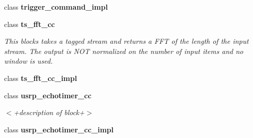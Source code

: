 \begin{DoxyCompactItemize}
class {\bf trigger\+\_\+command\+\_\+impl}
\item 
class {\bf ts\+\_\+fft\+\_\+cc}
\begin{DoxyCompactList}\small\item\em This blocks takes a tagged stream and returns a F\+FT of the length of the input stream. The output is N\+OT normalized on the number of input items and no window is used. \end{DoxyCompactList}\item 
class {\bf ts\+\_\+fft\+\_\+cc\+\_\+impl}
\item 
class {\bf usrp\+\_\+echotimer\+\_\+cc}
\begin{DoxyCompactList}\small\item\em $<$+description of block+$>$ \end{DoxyCompactList}\item 
class {\bf usrp\+\_\+echotimer\+\_\+cc\+\_\+impl}
\end{DoxyCompactItemize}
